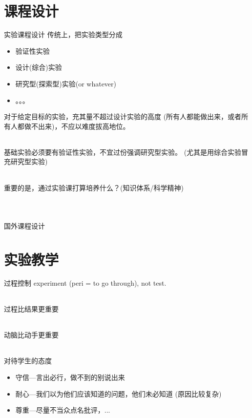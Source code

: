 \documentclass[10pt]{beamer}
\begin{document}
\begin{frame}
  \maketitle
\end{frame}

\section{课程设计}
\begin{frame}[t]{实验课程设计}
    传统上，把实验类型分成
\begin{itemize}
    \item \alert{验证性实验}
    \item \alert{设计(综合)实验}
    \item \alert{研究型(探索型)实验}(or whatever)
    \item 。。。
\end{itemize}
    对于给定目标的实验，充其量不超过设计实验的高度
    (所有人都能做出来，或者所有人都做不出来)，不应以难度拔高地位。

    ~\\

    基础实验必须要有验证性实验，不宜过份强调研究型实验。
    (尤其是用综合实验冒充研究型实验)

    ~\\

    重要的是，通过实验课打算培养什么？(知识体系/科学精神)
    ~\\ \ \\ \ \\ \ \\ {\tiny 国外课程设计}
\end{frame}

\section{实验教学}
\begin{frame}[t]{过程控制}
    experiment  (peri = to go through), not test.

    ~\\

    过程比结果更重要
   
    ~\\

    动脑比动手更重要

    ~\\

    对待学生的态度
\begin{itemize}
    \item 守信---言出必行，做不到的别说出来
    \item 耐心---我们以为他们应该知道的问题，他们未必知道 (原因比较复杂)
    \item 尊重---尽量不当众点名批评，...
\end{itemize}

\end{frame}
\end{document}
